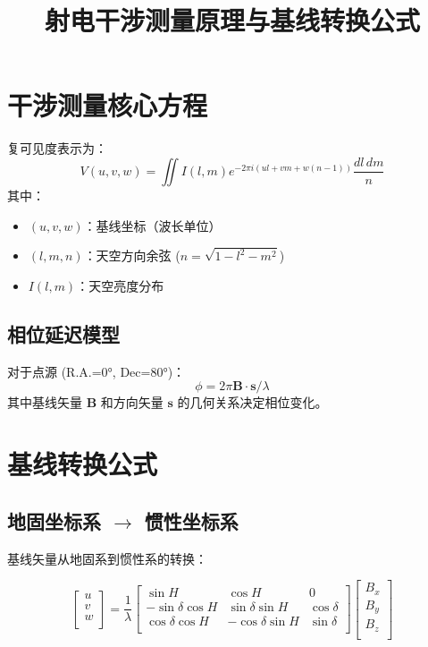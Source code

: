 \documentclass{article}
\title{射电干涉测量原理与基线转换公式}
\begin{document}
\maketitle
\section{干涉测量核心方程}
复可见度表示为：
\begin{equation}
V(u,v,w) = \iint I(l,m) e^{-2\pi i(ul + vm + w(n-1))} \frac{dl\,dm}{n}
\end{equation}
其中：
\begin{itemize}
\item $(u,v,w)$：基线坐标（波长单位）
\item $(l,m,n)$：天空方向余弦 ($n = \sqrt{1-l^2-m^2}$)
\item $I(l,m)$：天空亮度分布
\end{itemize}

\subsection{相位延迟模型}
对于点源 (R.A.=0°, Dec=80°)：
\begin{equation}
\phi = 2\pi \mathbf{B} \cdot \mathbf{s} / \lambda
\end{equation}
其中基线矢量 $\mathbf{B}$ 和方向矢量 $\mathbf{s}$ 的几何关系决定相位变化。

\section{基线转换公式}

\subsection{地固坐标系 $\rightarrow$ 惯性坐标系}
基线矢量从地固系到惯性系的转换：

\begin{equation}
\begin{bmatrix}
u \\
v \\
w \\
\end{bmatrix}
= \frac{1}{\lambda}
\begin{bmatrix}
\sin H & \cos H & 0 \\
-\sin \delta \cos H & \sin \delta \sin H & \cos \delta \\
\cos \delta \cos H & -\cos \delta \sin H & \sin \delta \\
\end{bmatrix}
\begin{bmatrix}
B_x \\
B_y \\
B_z \\
\end{bmatrix}
\end{equation}
\end{document}
